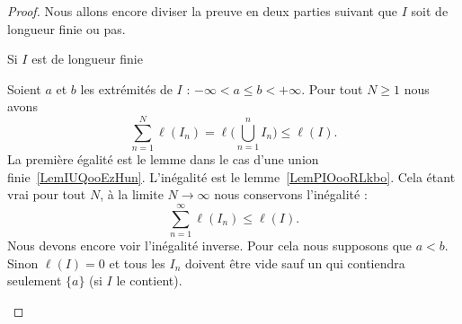 \begin{proof}
    Nous allons encore diviser la preuve en deux parties suivant que \( I\) soit de longueur finie ou pas.
    \begin{subproof}

        \item[Si \( I\) est de longueur finie]

            Soient \( a\) et \( b\) les extrémités de \( I\) : \( -\infty<a\leq b< +\infty\). Pour tout \( N\geq 1\) nous avons
            \begin{equation}
                \sum_{n=1}^N\ell(I_n)=\ell\big( \bigcup_{n=1}^nI_n \big)\leq \ell(I).
            \end{equation}
            La première égalité est le lemme dans le cas d'une union finie~\ref{LemIUQooEzHun}. L'inégalité est le lemme~\ref{LemPIOooRLkbo}. Cela étant vrai pour tout $N$, à la limite \( N\to\infty\) nous conservons l'inégalité :
            \begin{equation}
                \sum_{n=1}^{\infty}\ell(I_n)\leq \ell(I).
            \end{equation}
            Nous devons encore voir l'inégalité inverse. Pour cela nous supposons que \( a<b\). Sinon \( \ell(I)=0\) et tous les \( I_n\) doivent être vide sauf un qui contiendra seulement \( \{ a \}\) (si \( I\) le contient).


\end{subproof}
\end{proof}
